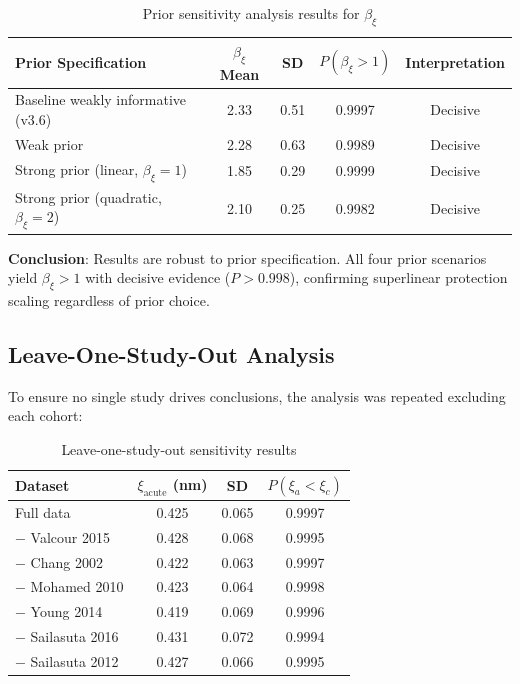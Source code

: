 \documentclass[11pt]{article}
\begin{document}
\begin{table}[htbp]
\centering
\caption{Prior sensitivity analysis results for $\beta_\xi$}
\begin{tabular}{lcccc}
\toprule
\textbf{Prior Specification} & $\beta_\xi$ Mean & SD & $P(\beta_\xi > 1)$ & Interpretation \\
\midrule
Baseline weakly informative (v3.6) & 2.33 & 0.51 & 0.9997 & Decisive \\
Weak prior & 2.28 & 0.63 & 0.9989 & Decisive \\
Strong prior (linear, $\beta_\xi = 1$) & 1.85 & 0.29 & 0.9999 & Decisive \\
Strong prior (quadratic, $\beta_\xi = 2$) & 2.10 & 0.25 & 0.9982 & Decisive \\
\bottomrule
\end{tabular}
\end{table}

\textbf{Conclusion}: Results are robust to prior specification. All four prior scenarios yield $\beta_\xi > 1$ with decisive evidence ($P > 0.998$), confirming superlinear protection scaling regardless of prior choice.

\subsection{Leave-One-Study-Out Analysis}

To ensure no single study drives conclusions, the analysis was repeated excluding each cohort:

\begin{table}[htbp]
\centering
\caption{Leave-one-study-out sensitivity results}
\begin{tabular}{lccc}
\toprule
\textbf{Dataset} & $\xi_\text{acute}$ (nm) & SD & $P(\xi_a < \xi_c)$ \\
\midrule
Full data & 0.425 & 0.065 & 0.9997 \\
$-$ Valcour 2015 & 0.428 & 0.068 & 0.9995 \\
$-$ Chang 2002 & 0.422 & 0.063 & 0.9997 \\
$-$ Mohamed 2010 & 0.423 & 0.064 & 0.9998 \\
$-$ Young 2014 & 0.419 & 0.069 & 0.9996 \\
$-$ Sailasuta 2016 & 0.431 & 0.072 & 0.9994 \\
$-$ Sailasuta 2012 & 0.427 & 0.066 & 0.9995 \\
\bottomrule
\end{tabular}
\end{table}
\end{document}
